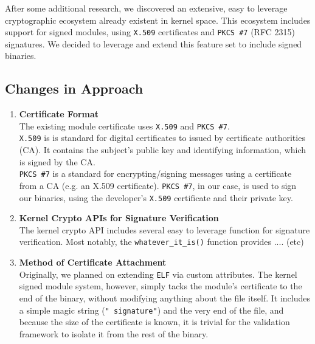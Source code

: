 \documentclass[12pt, letterpaper]{report}
\begin{document}
	After some additional research, we discovered an extensive, easy to leverage cryptographic ecosystem already existent in kernel space. This ecosystem includes support for signed modules, using \texttt{X.509} certificates and \texttt{PKCS \#7} (RFC 2315) signatures. We decided to leverage and extend this feature set to include signed binaries. 

	\subsection{Changes in Approach}
		\begin{enumerate}
			\item \textbf{Certificate Format} \\
			
			The existing module certificate uses \texttt{X.509} and \texttt{PKCS \#7}. \\
			
			\texttt{X.509} is is standard for digital certificates to issued by certificate authorities (CA). It contains the subject's public key and identifying information, which is signed by the CA. \\
			
			\texttt{PKCS \#7} is a standard for encrypting/signing messages using a certificate from a CA (e.g. an X.509 certificate). \texttt{PKCS \#7}, in our case, is used to sign our binaries, using the developer's \texttt{X.509} certificate and their private key. \\
			
			\item \textbf{Kernel Crypto APIs for Signature Verification} \\
			
			The kernel crypto API includes several easy to leverage function for signature verification. Most notably, the \texttt{whatever\_it\_is()} function provides .... (etc)
			
			\item \textbf{Method of Certificate Attachment} \\
			
				Originally, we planned on extending \texttt{ELF} via custom attributes. The kernel signed module system, however, simply tacks the module's certificate to the end of the binary, without modifying anything about the file itself. It includes a simple magic string (\texttt{"~signature"}) and the very end of the file, and because the size of the certificate is known, it is trivial for the validation framework to isolate it from the rest of the binary. 
		\end{enumerate}
\end{document}
